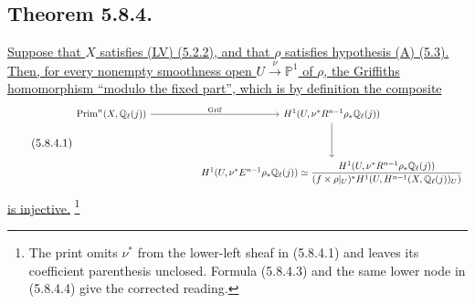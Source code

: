 \subsection*{Theorem 5.8.4.}
\underline{Suppose that $X$ satisfies (LV) (5.2.2), and that $\rho$
satisfies hypothesis (A) (5.3).  Then, for every nonempty smoothness open
$U\xrightarrow{\nu}\mathbb P^1$ of $\rho$, the Griffiths homomorphism
\textquotedblleft modulo the fixed part\textquotedblright{}, which is by
definition the composite}
\begin{equation}\tag{5.8.4.1}
\resizebox{\textwidth}{!}{%
\begin{tikzcd}[ampersand replacement=\&,row sep=huge,column sep=huge]
\operatorname{Prim}^n(X,\mathbb Q_\ell(j))
  \arrow[r,"\operatorname{Grif}"]
\&
H^1(U,\nu^*R^{n-1}\rho_*\mathbb Q_\ell(j))
  \arrow[d]
\\
{}
\&
H^1(U,\nu^*E^{n-1}\rho_*\mathbb Q_\ell(j))
\simeq
\dfrac{H^1(U,\nu^*R^{n-1}\rho_*\mathbb Q_\ell(j))}
{(f\times\rho|_U)^*
 H^1(U,H^{n-1}(X,\mathbb Q_\ell(j))_U)}
\end{tikzcd}}
\end{equation}
\underline{is injective.}
\footnote{The print omits $\nu^*$ from the lower-left sheaf in (5.8.4.1)
and leaves its coefficient parenthesis unclosed.  Formula (5.8.4.3) and the
same lower node in (5.8.4.4) give the corrected reading.}

